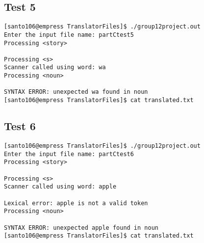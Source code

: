 \documentclass{article}
\begin{document}
	\subsection{Test 5}
	\begin{Verbatim}
[santo106@empress TranslatorFiles]$ ./group12project.out
Enter the input file name: partCtest5
Processing <story>

Processing <s>
Scanner called using word: wa
Processing <noun>

SYNTAX ERROR: unexpected wa found in noun
[santo106@empress TranslatorFiles]$ cat translated.txt
	\end{Verbatim}
	
	\subsection{Test 6}
	\begin{Verbatim}
[santo106@empress TranslatorFiles]$ ./group12project.out
Enter the input file name: partCtest6
Processing <story>

Processing <s>
Scanner called using word: apple

Lexical error: apple is not a valid token
Processing <noun>

SYNTAX ERROR: unexpected apple found in noun
[santo106@empress TranslatorFiles]$ cat translated.txt
	\end{Verbatim}
\end{document}
